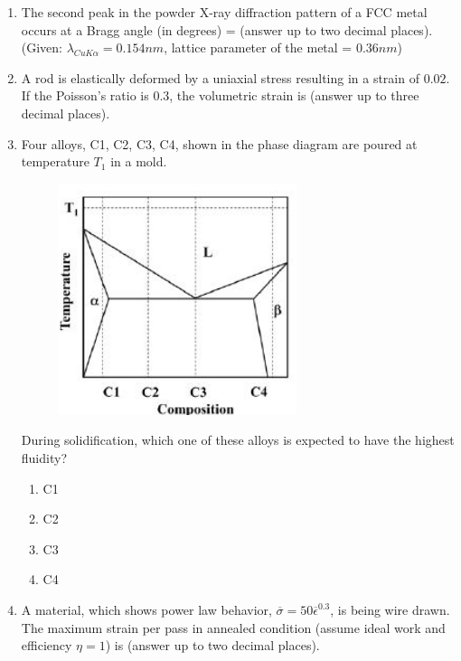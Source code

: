 \documentclass[journal]{IEEEtran}
\theoremstyle{remark}
\begin{document}
\begin{enumerate}
\item The second peak in the powder X-ray diffraction pattern of a FCC metal occurs at a Bragg angle (in degrees) = \underline {\hspace{2cm}} (answer up to two decimal places). (Given: $\lambda_{CuK\alpha} = 0.154 nm$, lattice parameter of the metal = $0.36 nm$) \hfill{}

\item A rod is elastically deformed by a uniaxial stress resulting in a strain of $0.02$. If the Poisson's ratio is $0.3$, the volumetric strain is \underline {\hspace{2cm}} (answer up to three decimal places). \hfill{}

\item Four alloys, C1, C2, C3, C4, shown in the phase diagram are poured at temperature $T_1$ in a mold.
\begin{figure}[H]
    \centering
    \includegraphics[width=0.3\columnwidth]{figs/Q.21.png}
    \caption{}
    \label{fig:placeholder}
\end{figure}
During solidification, which one of these alloys is expected to have the highest fluidity? \hfill{}
\begin{multicols}{4}
\begin{enumerate}
    \item C1
    \item C2
    \item C3
    \item C4
\end{enumerate}
\end{multicols}

\item A material, which shows power law behavior, $\overline{\sigma}=50\overline{\epsilon}^{0.3}$, is being wire drawn. The maximum strain per pass in annealed condition (assume ideal work and efficiency $\eta=1$) is \underline {\hspace{2cm}} (answer up to two decimal places). \hfill{}


\end{enumerate}
\end{document}
